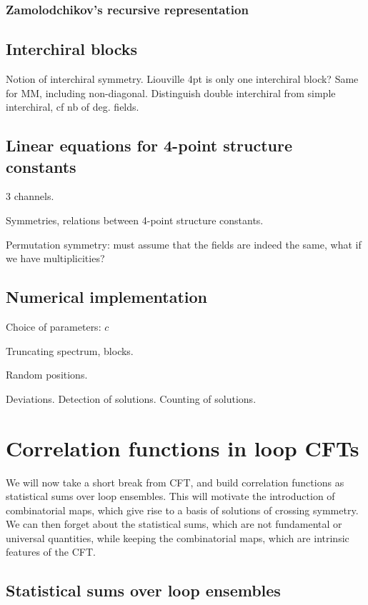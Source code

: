 \documentclass[12pt, a4paper]{article}
\theoremstyle{break}
\begin{document}
\subsubsection{Zamolodchikov's recursive representation}

\subsection{Interchiral blocks} \label{sec:icb}

Notion of interchiral symmetry. Liouville 4pt is only one interchiral block? Same for MM, including non-diagonal. Distinguish double interchiral from simple interchiral, cf nb of deg. fields. 

\subsection{Linear equations for 4-point structure constants}

3 channels. 

Symmetries, relations between 4-point structure constants. 

Permutation symmetry: must assume that the fields are indeed the same, what if we have multiplicities? 

\subsection{Numerical implementation}

Choice of parameters: $c$

Truncating spectrum, blocks.

Random positions.

Deviations. Detection of solutions. Counting of solutions.


\section{Correlation functions in loop CFTs} \label{sec:cloop}

We will now take a short break from CFT, and build correlation functions as statistical sums over loop ensembles. This will motivate the introduction of combinatorial maps, which give rise to a basis of solutions of crossing symmetry. We can then forget about the statistical sums, which are not fundamental or universal quantities, while keeping the combinatorial maps, which are intrinsic features of the CFT.

\subsection{Statistical sums over loop ensembles}
\end{document}
